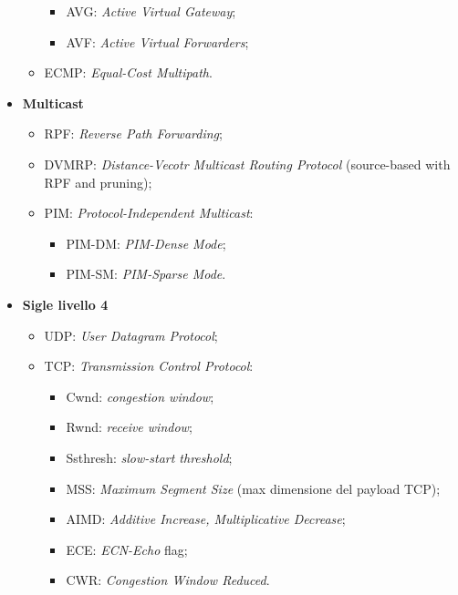 \begin{itemize}
\begin{itemize}
\begin{itemize}
\item{AVG}: \emph{Active Virtual Gateway};
\item{AVF}: \emph{Active Virtual Forwarders};

\end{itemize}

\item{ECMP}: \emph{Equal-Cost Multipath}.

\end{itemize}

\item{\textbf{Multicast}}

\begin{itemize}

\item{RPF}: \emph{Reverse Path Forwarding};
\item{DVMRP}: \emph{Distance-Vecotr Multicast Routing Protocol} (source-based with RPF and pruning);
\item{PIM}: \emph{Protocol-Independent Multicast}:

\begin{itemize}

\item{PIM-DM}: \emph{PIM-Dense Mode};
\item{PIM-SM}: \emph{PIM-Sparse Mode}.

\end{itemize}

\end{itemize}

\item{\textbf{Sigle livello 4}}

\begin{itemize}

\item{UDP}: \emph{User Datagram Protocol};
\item{TCP}: \emph{Transmission Control Protocol}:

\begin{itemize}

\item{Cwnd}: \emph{congestion window};
\item{Rwnd}: \emph{receive window};
\item{Ssthresh}: \emph{slow-start threshold};\
\item{MSS}: \emph{Maximum Segment Size} (max dimensione del payload TCP);
\item{AIMD}: \emph{Additive Increase, Multiplicative Decrease};
\item{ECE}: \emph{ECN-Echo} flag;
\item{CWR}: \emph{Congestion Window Reduced}.


\end{itemize}
\end{itemize}
\end{itemize}
